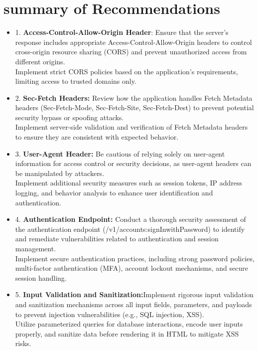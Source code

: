 \documentclass[openany]{report}
\begin{document}
\section{summary of Recommendations}
\begin{itemize}
    \item 1. \textbf{Access-Control-Allow-Origin Header}:
          Ensure that the server's response includes appropriate Access-Control-Allow-Origin headers to control cross-origin resource sharing (CORS) and prevent unauthorized access from different origins.\\
          Implement strict CORS policies based on the application's requirements, limiting access to trusted domains only.
    \item 2. \textbf{Sec-Fetch Headers:} Review how the application handles Fetch Metadata headers (Sec-Fetch-Mode, Sec-Fetch-Site, Sec-Fetch-Dest) to prevent potential security bypass or spoofing attacks.\\
          Implement server-side validation and verification of Fetch Metadata headers to ensure they are consistent with expected behavior.
    \item 3. \textbf{User-Agent Header:} Be cautious of relying solely on user-agent information for access control or security decisions, as user-agent headers can be manipulated by attackers.\\
          Implement additional security measures such as session tokens, IP address logging, and behavior analysis to enhance user identification and authentication.
    \item 4. \textbf{Authentication Endpoint:} Conduct a thorough security assessment of the authentication endpoint (/v1/accounts:signInwithPassword) to identify and remediate vulnerabilities related to authentication and session management.\\
          Implement secure authentication practices, including strong password policies, multi-factor authentication (MFA), account lockout mechanisms, and secure session handling.
    \item 5. \textbf{Input Validation and Sanitization:}Implement rigorous input validation and sanitization mechanisms across all input fields, parameters, and payloads to prevent injection vulnerabilities (e.g., SQL injection, XSS).\\
          Utilize parameterized queries for database interactions, encode user inputs properly, and sanitize data before rendering it in HTML to mitigate XSS risks.

\end{itemize}
\end{document}
